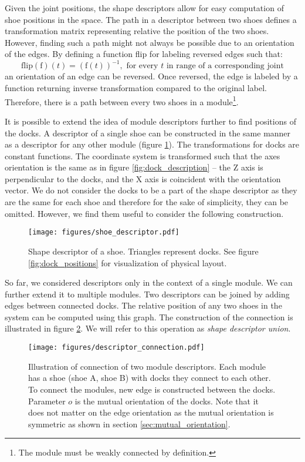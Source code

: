 Given the joint positions, the shape descriptors allow for easy computation of
shoe positions in the space. The path in a descriptor between two shoes defines
a transformation matrix representing relative the position of the two shoes.
However, finding such a path might not always be possible due to an orientation
of the edges. By defining a function flip for labeling reversed edges such that:
\[\text{flip}(\text{f})(t) = (\text{f}(t))^{-1}, \text{ for every } t \text{ in
range of a corresponding joint}\] an orientation of an edge can be reversed.
Once reversed, the edge is labeled by a function returning inverse
transformation compared to the original label. Therefore, there is a path
between every two shoes in a module\footnote{The module must be weakly
connected by definition.}.

It is possible to extend the idea of module descriptors further to find
positions of the docks. A descriptor of a single shoe can be constructed in the
same manner as a descriptor for any other module (figure
\ref{fig:shoe_descriptor}). The transformations for docks are constant
functions. The coordinate system is transformed such that the axes orientation
is the same as in figure \ref{fig:dock_description} -- the Z axis is
perpendicular to the docks, and the X axis is coincident with the orientation
vector. We do not consider the docks to be a part of the shape descriptor as
they are the same for each shoe and therefore for the sake of simplicity, they
can be omitted. However, we find them useful to consider the following
construction.

\begin{figure}[t]
    \centering
    \texttt{[image: figures/shoe\_descriptor.pdf]}
    \caption{Shape descriptor of a shoe. Triangles represent docks. See figure
    \ref{fig:dock_positions} for visualization of physical layout.}
    \label{fig:shoe_descriptor}
\end{figure}

So far, we considered descriptors only in the context of a single module. We can
further extend it to multiple modules. Two descriptors can be joined by adding
edges between connected docks. The relative position of any two shoes in the
system can be computed using this graph. The construction of the connection is
illustrated in figure \ref{fig:connection_descriptor}. We will refer to this
operation as \emph{shape descriptor union}.

\begin{figure}[t]
    \centering
    \texttt{[image: figures/descriptor\_connection.pdf]}
    \caption{Illustration of connection of two module descriptors. Each module
    has a shoe (shoe A, shoe B) with docks they connect to each other. To
    connect the modules, new edge is constructed between the docks. Parameter
    $o$ is the mutual orientation of the docks. Note that it does not matter on
    the edge orientation as the mutual orientation is symmetric as shown in
    section \ref{sec:mutual_orientation}. }
    \label{fig:connection_descriptor}
\end{figure}

